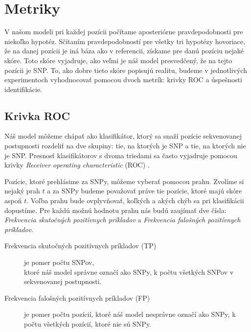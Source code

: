 \section{Metriky}

V našom modeli pri každej pozícii počítame aposteriórne pravdepodobnosti pre niekoľko hypotéz. Sčítaním
pravdepodobností pre všetky tri hypotézy hovoriace, že na danej pozícii je iná báza ako v referencii,
získame pre danú pozíciu nejaké skóre. Toto skóre vyjadruje, ako veľmi je náš model presvedčený, že na tejto pozícii je SNP. To, ako dobre tieto skóre popisujú realitu, budeme v jednotlivých experimentoch vyhodnocovať pomocou dvoch metrík: krivky ROC a úspešnosti identifikácie.

\subsection{Krivka ROC}

Náš model môžeme chápať ako klasifikátor, ktorý sa snaží pozície sekvenovanej postupnosti rozdeliť
na dve skupiny: tie, na ktorých je SNP a tie, na ktorých nie je SNP.
Presnosť klasifikátorov s dvoma triedami sa často vyjadruje pomocou krivky \emph{Receiver operating characteristic} (ROC) \cite{ROC}.

Pozície, ktoré prehlásime za SNPy, môžeme vyberať pomocou prahu. Zvolíme si nejaký prah $t$ a za
SNPy budeme považovať práve tie pozície, ktoré majú skóre aspoň $t$. Voľba prahu bude ovplyvňovať,
koľkých a akých chýb sa pri klasifikácii dopustíme.
Pre každú možnú hodnotu prahu nás budú zaujímať dve čísla: \emph{Frekvencia skutočných pozitívnych príkladov} 
 a \emph{Frekvencia falošných pozitívnych príkladov}. 

\begin{definicia} 
\leavevmode
\begin{description}
\item[Frekvencia skutočných pozitívnych príkladov (TP\footnotemark)]  
je pomer počtu SNPov, \\ ktoré náš model správne označí ako SNPy, k počtu všetkých SNPov v sekvenovanej postupnosti.
\item[Frekvencia falošných pozitívnych príkladov (FP\footnotemark)]  
je pomer počtu
pozícií, ktoré náš model nesprávne označí ako SNPy, k počtu všetkých pozícií, ktoré nie sú SNPy.
\end{description}
\end{definicia}

